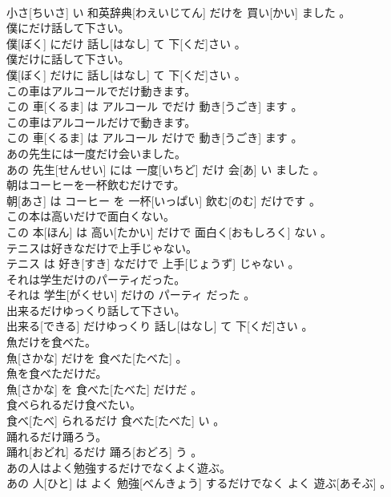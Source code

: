 \documentclass[8pt]{extreport}
\begin{document}
\begin{CJK}{UTF8}{min}
\\	小さ[ちいさ] い 和英辞典[わえいじてん] だけを 買い[かい] ました 。
\\	僕にだけ話して下さい。	
\\	僕[ぼく] にだけ 話し[はなし] て 下[くだ]さい 。
\\	僕だけに話して下さい。	
\\	僕[ぼく] だけに 話し[はなし] て 下[くだ]さい 。
\\	この車はアルコールでだけ動きます。	
\\	この 車[くるま] は アルコール でだけ 動き[うごき] ます 。
\\	この車はアルコールだけで動きます。	
\\	この 車[くるま] は アルコール だけで 動き[うごき] ます 。
\\	あの先生には一度だけ会いました。	
\\	あの 先生[せんせい] には 一度[いちど] だけ 会[あ] い ました 。
\\	朝はコーヒーを一杯飲むだけです。	
\\	朝[あさ] は コーヒー を 一杯[いっぱい] 飲む[のむ] だけです 。
\\	この本は高いだけで面白くない。	
\\	この 本[ほん] は 高い[たかい] だけで 面白く[おもしろく] ない 。
\\	テニスは好きなだけで上手じゃない。	
\\	テニス は 好き[すき] なだけで 上手[じょうず] じゃない 。
\\	それは学生だけのパーティだった。	
\\	それは 学生[がくせい] だけの パーティ だった 。
\\	出来るだけゆっくり話して下さい。	
\\	出来る[できる] だけゆっくり 話し[はなし] て 下[くだ]さい 。
\\	魚だけを食べた。	
\\	魚[さかな] だけを 食べた[たべた] 。
\\	魚を食べただけだ。	
\\	魚[さかな] を 食べた[たべた] だけだ 。
\\	食べられるだけ食べたい。	
\\	食べ[たべ] られるだけ 食べた[たべた] い 。
\\	踊れるだけ踊ろう。	
\\	踊れ[おどれ] るだけ 踊ろ[おどろ] う 。
\\	あの人はよく勉強するだけでなくよく遊ぶ。	
\\	あの 人[ひと] は よく 勉強[べんきょう] するだけでなく よく 遊ぶ[あそぶ] 。

\end{CJK}
\end{document}
